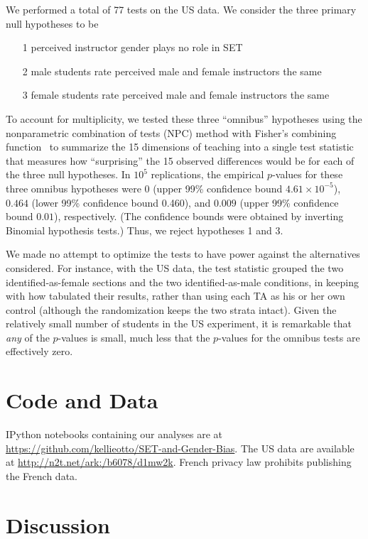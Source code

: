 \documentclass[12pt]{article}
\begin{document}
We performed a total of 77 tests on the US data.
We consider the three primary null hypotheses to be
\begin{enumerate}
   \item[1\sc{us}] perceived instructor gender plays no role in SET
   \item[2\sc{us}] male students rate perceived male and female instructors the same
   \item[3\sc{us}] female students rate perceived male and female instructors the same
\end{enumerate}
To account for multiplicity, we tested these three ``omnibus'' hypotheses 
using the nonparametric combination of tests (NPC) method with Fisher's combining 
function~\citep[Chapter 4]{pesarinSalmaso10} to summarize the 15 dimensions of teaching into
a single test statistic that measures how ``surprising'' the 15 observed differences would be
for each of the three null hypotheses.
In $10^5$ replications, the empirical $p$-values for these three omnibus hypotheses were 
$0$ (upper 99\% confidence bound $4.61 \times 10^{-5}$), 
$0.464$ (lower 99\% confidence bound 0.460), and 
$0.009$ (upper 99\% confidence bound $0.01$), respectively.
(The confidence bounds were obtained by inverting Binomial hypothesis tests.)
Thus, we reject hypotheses 1{} and 3{}.

We made no attempt to optimize the tests to have power 
against the alternatives considered.
For instance, with the US data, the test statistic
grouped the two identified-as-female sections and the two identified-as-male conditions,
in keeping with how \citet{MacNell2014} tabulated their results,
rather than using each TA as his or her own control (although the randomization keeps the 
two strata intact). 
Given the relatively small number of students in the US experiment, it is remarkable that
\emph{any} of the $p$-values is small, much less that the $p$-values for the omnibus
tests are effectively zero.

\section{Code and Data}
IPython notebooks containing our analyses are at
\url{https://github.com/kellieotto/SET-and-Gender-Bias}.
The US data are available at \url{http://n2t.net/ark:/b6078/d1mw2k}.
French privacy law prohibits publishing the French data. 


\section{Discussion}
\end{document}
